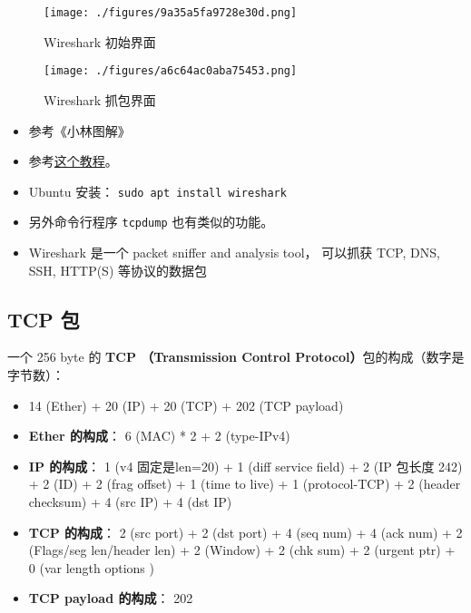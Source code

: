 
\begin{issues}
\issueDraft
\end{issues}

\begin{figure}[ht]
\centering
\texttt{[image: ./figures/9a35a5fa9728e30d.png]}
\caption{Wireshark 初始界面} \label{fig_wiresh_1}
\end{figure}

\begin{figure}[ht]
\centering
\texttt{[image: ./figures/a6c64ac0aba75453.png]}
\caption{Wireshark 抓包界面} \label{fig_wiresh_2}
\end{figure}


\begin{itemize}
\item 参考《小林图解》
\item 参考\href{https://www.varonis.com/blog/how-to-use-wireshark}{这个教程}。
\item Ubuntu 安装： \verb`sudo apt install wireshark`
\item 另外命令行程序 \verb`tcpdump` 也有类似的功能。
\item Wireshark 是一个 packet sniffer and analysis tool， 可以抓获 TCP, DNS, SSH, HTTP(S)   等协议的数据包
\end{itemize}

\subsection{TCP 包}
一个 256 byte 的 \textbf{TCP （Transmission Control Protocol）}包的构成（数字是字节数）：
\begin{itemize}
\item 14 (Ether) + 20 (IP) + 20 (TCP) + 202 (TCP payload)
\item \textbf{Ether 的构成}： 6 (MAC) * 2 + 2 (type-IPv4)
\item \textbf{IP 的构成}： 1 (v4 固定是len=20) + 1 (diff service field) + 2 (IP 包长度 242) + 2 (ID) + 2 (frag offset) + 1 (time to live) + 1 (protocol-TCP) + 2 (header checksum) + 4 (src IP) + 4 (dst IP)
\item \textbf{TCP 的构成}： 2 (src port) + 2 (dst port) + 4 (seq num) + 4 (ack num) + 2 (Flags/seg len/header len) + 2 (Window) + 2 (chk sum) + 2 (urgent ptr) + 0 (var length options )
\item \textbf{TCP payload 的构成}： 202
\end{itemize}

